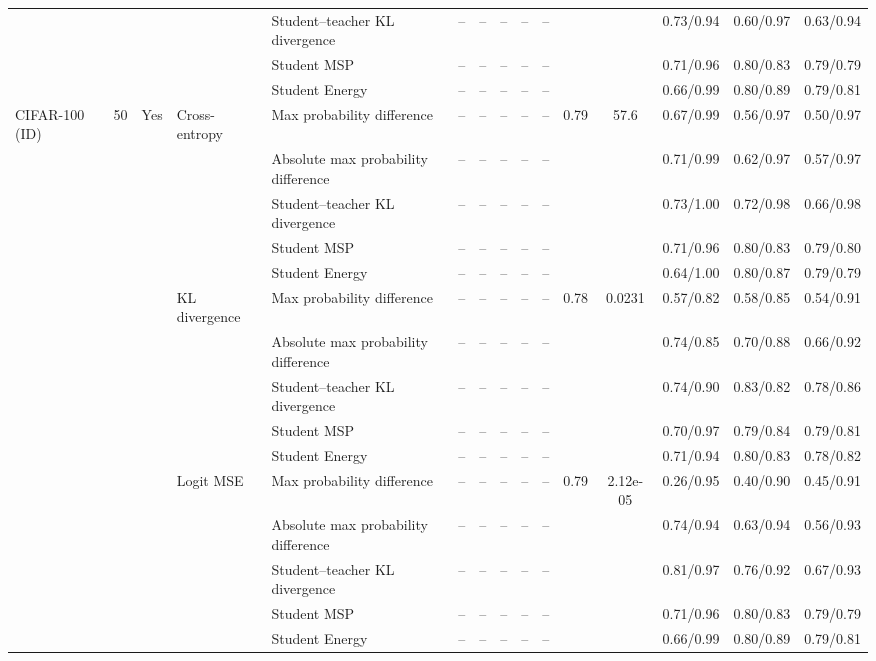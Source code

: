 \documentclass[border=2pt]{standalone}
\begin{document}
\begin{tabular}{lllllcccccccccc}
 &  &  &  & Student--teacher KL divergence & -- & -- & -- & -- & -- &  &  & 0.73/0.94 & 0.60/0.97 & 0.63/0.94 \\
 &  &  &  & Student MSP & -- & -- & -- & -- & -- &  &  & 0.71/0.96 & 0.80/0.83 & 0.79/0.79 \\
 &  &  &  & Student Energy & -- & -- & -- & -- & -- &  &  & 0.66/0.99 & 0.80/0.89 & 0.79/0.81 \\
\addlinespace
CIFAR-100 (ID) & 50 & Yes & Cross-entropy & Max probability difference & -- & -- & -- & -- & -- & 0.79 & 57.6 & 0.67/0.99 & 0.56/0.97 & 0.50/0.97 \\
 &  &  &  & Absolute max probability difference & -- & -- & -- & -- & -- &  &  & 0.71/0.99 & 0.62/0.97 & 0.57/0.97 \\
 &  &  &  & Student--teacher KL divergence & -- & -- & -- & -- & -- &  &  & 0.73/1.00 & 0.72/0.98 & 0.66/0.98 \\
 &  &  &  & Student MSP & -- & -- & -- & -- & -- &  &  & 0.71/0.96 & 0.80/0.83 & 0.79/0.80 \\
 &  &  &  & Student Energy & -- & -- & -- & -- & -- &  &  & 0.64/1.00 & 0.80/0.87 & 0.79/0.79 \\
 &  &  & KL divergence & Max probability difference & -- & -- & -- & -- & -- & 0.78 & 0.0231 & 0.57/0.82 & 0.58/0.85 & 0.54/0.91 \\
 &  &  &  & Absolute max probability difference & -- & -- & -- & -- & -- &  &  & 0.74/0.85 & 0.70/0.88 & 0.66/0.92 \\
 &  &  &  & Student--teacher KL divergence & -- & -- & -- & -- & -- &  &  & 0.74/0.90 & 0.83/0.82 & 0.78/0.86 \\
 &  &  &  & Student MSP & -- & -- & -- & -- & -- &  &  & 0.70/0.97 & 0.79/0.84 & 0.79/0.81 \\
 &  &  &  & Student Energy & -- & -- & -- & -- & -- &  &  & 0.71/0.94 & 0.80/0.83 & 0.78/0.82 \\
 &  &  & Logit MSE & Max probability difference & -- & -- & -- & -- & -- & 0.79 & 2.12e-05 & 0.26/0.95 & 0.40/0.90 & 0.45/0.91 \\
 &  &  &  & Absolute max probability difference & -- & -- & -- & -- & -- &  &  & 0.74/0.94 & 0.63/0.94 & 0.56/0.93 \\
 &  &  &  & Student--teacher KL divergence & -- & -- & -- & -- & -- &  &  & 0.81/0.97 & 0.76/0.92 & 0.67/0.93 \\
 &  &  &  & Student MSP & -- & -- & -- & -- & -- &  &  & 0.71/0.96 & 0.80/0.83 & 0.79/0.79 \\
 &  &  &  & Student Energy & -- & -- & -- & -- & -- &  &  & 0.66/0.99 & 0.80/0.89 & 0.79/0.81 \\

\end{tabular}
\end{document}
